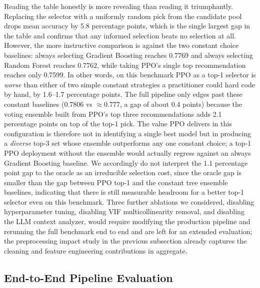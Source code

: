 \documentclass{article}
\begin{document}
Reading the table honestly is more revealing than reading it triumphantly.
Replacing the selector with a uniformly random pick from the candidate pool
drops mean accuracy by 5.8 percentage points, which is the single largest
gap in the table and confirms that any informed selection beats no selection
at all. However, the more instructive comparison is against the two constant
choice baselines: always selecting Gradient Boosting reaches 0.7769 and
always selecting Random Forest reaches 0.7762, while taking PPO's single
top recommendation reaches only 0.7599. In other words, on this benchmark
PPO as a top-1 selector is \emph{worse} than either of two simple constant
strategies a practitioner could hard code by hand, by 1.6--1.7 percentage
points. The full pipeline only edges past these constant baselines (0.7806
vs $\approx 0.777$, a gap of about 0.4 points) because the voting ensemble
built from PPO's top three recommendations adds 2.1 percentage points on
top of the top-1 pick. The value PPO delivers in this configuration is
therefore not in identifying a single best model but in producing a
\emph{diverse} top-3 set whose ensemble outperforms any one constant choice;
a top-1 PPO deployment without the ensemble would actually regress against
an always Gradient Boosting baseline. We accordingly do not interpret the
1.1 percentage point gap to the oracle as an irreducible selection cost,
since the oracle gap is smaller than the gap between PPO top-1 and the
constant tree ensemble baselines, indicating that there is still measurable
headroom for a better top-1 selector even on this benchmark. Three further
ablations we considered, disabling hyperparameter tuning, disabling VIF
multicollinearity removal, and disabling the LLM context analyzer, would
require modifying the production pipeline and rerunning the full benchmark
end to end and are left for an extended evaluation; the preprocessing
impact study in the previous subsection already captures the cleaning and
feature engineering contributions in aggregate.

\subsection{End-to-End Pipeline Evaluation}
\end{document}
